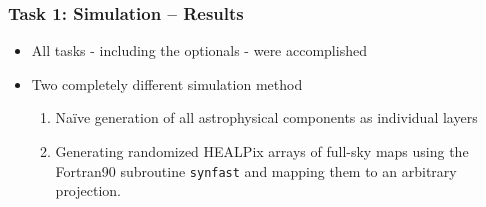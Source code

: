 \begin{frame}
\frametitle{Task 1: Simulation -- Results}

\begin{itemize}
	\item<1-> All tasks - including the optionals - were accomplished
	\item<1-> Two completely different simulation method
	\begin{enumerate}
		\item<1-> Naïve generation of all astrophysical components as individual layers
		\item<1-> Generating randomized HEALPix arrays of full-sky maps using the Fortran90 subroutine \texttt{synfast} and mapping them to an arbitrary projection.
	\end{enumerate}
\end{itemize}

\end{frame}